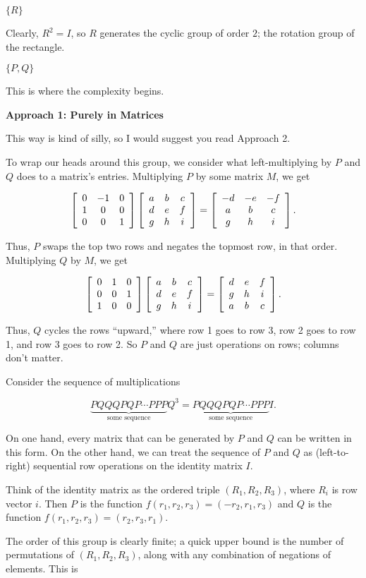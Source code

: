 \documentclass[../key.tex]{subfiles}
\begin{document}
\begin{inner_problem}
\item $\{R\}$
\end{inner_problem}

Clearly, $R^2 = I$, so $R$ generates the cyclic group of order $2$; the rotation group of the rectangle.

\begin{inner_problem}
\item $\{P,Q\}$
\end{inner_problem}

This is where the complexity begins.

\textbf{Approach 1: Purely in Matrices}

This way is kind of silly, so I would suggest you read Approach 2.

To wrap our heads around this group, we consider what left-multiplying by $P$ and $Q$ does to a matrix's entries. Multiplying $P$ by some matrix $M$, we get

$$\left[\begin{array}{ccc} 0 & -1 & 0 \\ 1 & 0 & 0 \\ 0 & 0 & 1 \end{array}\right]\left[\begin{array}{ccc} a & b & c \\ d & e & f \\ g & h & i \end{array}\right] = \left[\begin{array}{ccc} -d & -e & -f \\ a & b & c \\ g & h & i \end{array}\right].$$

Thus, $P$ swaps the top two rows and negates the topmost row, in that order. Multiplying $Q$ by $M$, we get

$$\left[\begin{array}{ccc} 0 & 1 & 0 \\ 0 & 0 & 1 \\ 1 & 0 & 0 \end{array}\right]\left[\begin{array}{ccc} a & b & c \\ d & e & f \\ g & h & i \end{array}\right] = \left[\begin{array}{ccc} d & e & f \\ g & h & i \\ a & b & c \end{array}\right].$$

Thus, $Q$ cycles the rows ``upward,'' where row 1 goes to row 3, row 2 goes to row 1, and row 3 goes to row 2. So $P$ and $Q$ are just operations on rows; columns don't matter.

Consider the sequence of multiplications

$$\underbrace{PQQQPQP\cdots PPP}_{\text{some sequence}} Q^3 = \underbrace{PQQQPQP\cdots PPP}_{\text{some sequence}} I.$$

On one hand, every matrix that can be generated by $P$ and $Q$ can be written in this form. On the other hand, we can treat the sequence of $P$ and $Q$ as (left-to-right) sequential row operations on the identity matrix $I$.

Think of the identity matrix as the ordered triple $(R_1,R_2,R_3)$, where $R_i$ is row vector $i$. Then $P$ is the function $f(r_1,r_2,r_3) = (-r_2,r_1,r_3)$ and $Q$ is the function $f(r_1,r_2,r_3) = (r_2,r_3,r_1)$.

The order of this group is clearly finite; a quick upper bound is the number of permutations of $(R_1,R_2,R_3)$, along with any combination of negations of elements. This is
\end{document}
